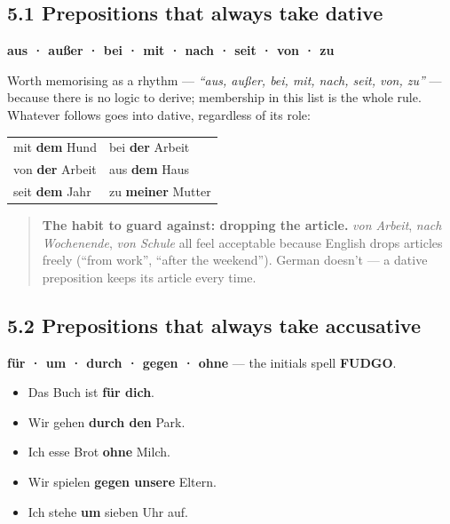 \documentclass[
  11pt,
]{article}
\newcounter{none} %
\providecommand{\tightlist}{%
  \setlength{\itemsep}{0pt}\setlength{\parskip}{0pt}}
\begin{document}
\subsection{5.1 Prepositions that always take
dative}\label{prepositions-that-always-take-dative}

\textbf{aus · außer · bei · mit · nach · seit · von · zu}

Worth memorising as a rhythm --- \emph{``aus, außer, bei, mit, nach,
seit, von, zu''} --- because there is no logic to derive; membership in
this list is the whole rule. Whatever follows goes into dative,
regardless of its role:

{\def\LTcaptype{none} %
\begin{longtable}[]{@{}ll@{}}
\toprule\noalign{}
\endhead
\bottomrule\noalign{}
\endlastfoot
mit \textbf{dem} Hund & bei \textbf{der} Arbeit \\
von \textbf{der} Arbeit & aus \textbf{dem} Haus \\
seit \textbf{dem} Jahr & zu \textbf{meiner} Mutter \\
\end{longtable}
}

\begin{quote}
\textbf{The habit to guard against: dropping the article.} \emph{von
Arbeit}, \emph{nach Wochenende}, \emph{von Schule} all feel acceptable
because English drops articles freely (``from work'', ``after the
weekend''). German doesn't --- a dative preposition keeps its article
every time.
\end{quote}

\subsection{5.2 Prepositions that always take
accusative}\label{prepositions-that-always-take-accusative}

\textbf{für · um · durch · gegen · ohne} --- the initials spell
\textbf{FUDGO}.

\begin{itemize}
\tightlist
\item
  Das Buch ist \textbf{für dich}.
\item
  Wir gehen \textbf{durch den} Park.
\item
  Ich esse Brot \textbf{ohne} Milch.
\item
  Wir spielen \textbf{gegen unsere} Eltern.
\item
  Ich stehe \textbf{um} sieben Uhr auf.
\end{itemize}
\end{document}
